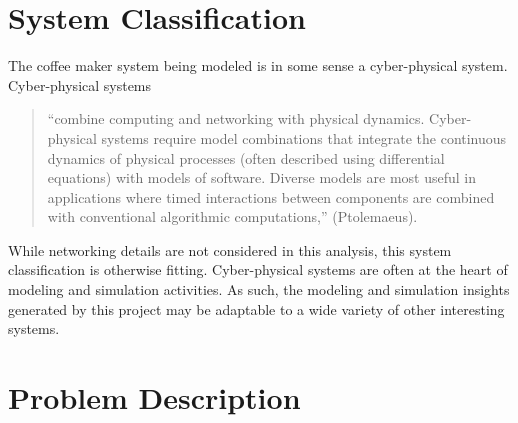 \documentclass[10pt]{article}
\begin{document}


\section{System Classification}
The coffee maker system being modeled is in some sense a cyber-physical system.  Cyber-physical systems
\begin{quote}
``combine computing and networking with physical dynamics. Cyber-physical systems require model combinations that integrate the continuous dynamics of physical processes (often described using differential equations) with models of software.  Diverse models are most useful in applications where timed interactions between components are combined with conventional algorithmic computations,'' (Ptolemaeus).
\end{quote}
While networking details are not considered in this analysis, this system classification is otherwise fitting.  Cyber-physical systems are often at the heart of modeling and simulation activities.  As such, the modeling and simulation insights generated by this project may be adaptable to a wide variety of other interesting systems.  

\section{Problem Description}
\end{document}

